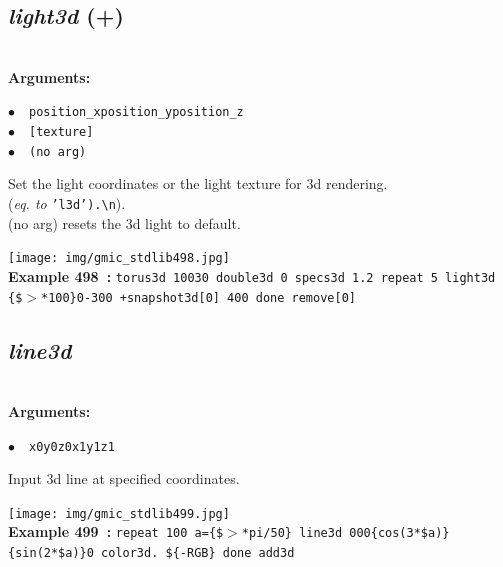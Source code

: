 \documentclass[a4paper,10.5pt,twoside]{book}
\def\comma{\discretionary{,}{}{,}}
\newcommand{\Cb}[1]{\textcolor{cb}{#1}}
\begin{document}
\subsection{\emph{light3d} (+)}\vspace*{-0.7em}
~\\\textbf{\Cb{Arguments: }}\begin{flushleft}
{\small \Cb{\hspace*{0.5cm}$\bullet$~~\texttt{position\_x{\comma}position\_y{\comma}position\_z}}}~~~\\
{\small \Cb{\hspace*{0.5cm}$\bullet$~~\texttt{[texture]}}}~~~\\
{\small \Cb{\hspace*{0.5cm}$\bullet$~~\texttt{(no arg)}}}\end{flushleft}
Set the light coordinates or the light texture for 3d rendering.
~\\(\emph{eq. to} {\small \texttt{'l3d').\textbackslash n}}).
~\\(no arg) resets the 3d light to default.
\begin{center}\texttt{[image: img/gmic\_stdlib498.jpg]}\\
{\footnotesize \textbf{Example 498~:} \texttt{torus3d 100{\comma}30 double3d 0 specs3d 1.2 repeat 5 light3d \{\$$>$*100\}{\comma}0{\comma}-300 +snapshot3d[0] 400 done remove[0]}}
\end{center}

\subsection{\emph{line3d} }\vspace*{-0.7em}
~\\\textbf{\Cb{Arguments: }}\begin{flushleft}
{\small \Cb{\hspace*{0.5cm}$\bullet$~~\texttt{x0{\comma}y0{\comma}z0{\comma}x1{\comma}y1{\comma}z1}}}\end{flushleft}
Input 3d line at specified coordinates.
\begin{center}\texttt{[image: img/gmic\_stdlib499.jpg]}\\
{\footnotesize \textbf{Example 499~:} \texttt{repeat 100 a=\{\$$>$*pi/50\} line3d 0{\comma}0{\comma}0{\comma}\{cos(3*\$a)\}{\comma}\{sin(2*\$a)\}{\comma}0 color3d. \$\{-RGB\} done add3d}}
\end{center}
\end{document}
